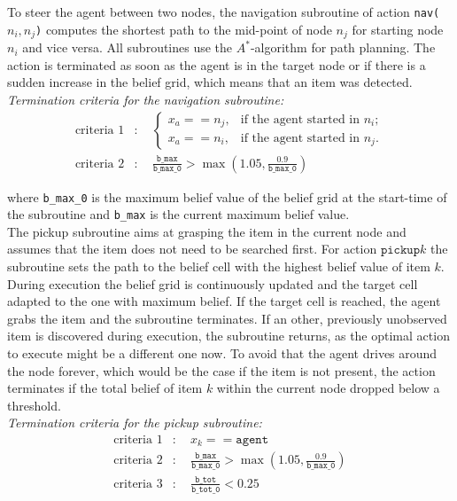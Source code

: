To steer the agent between two nodes, the navigation subroutine of action \texttt{nav($n_i, n_j$)} computes the shortest path to the mid-point of node $n_j$ for starting node $n_i$ and vice versa. All subroutines use the $A^*$-algorithm for path planning. The action is terminated as soon as the agent is in the target node or if there is a sudden increase in the belief grid, which means that an item was detected.\\

\textit{Termination criteria for the navigation subroutine:}
\begin{align}
    \text{criteria 1}&: \quad
    \begin{cases}x_a == n_j, &\text{if the agent started in }n_i;\\ 
    x_a == n_i, & \text{if the agent started in }n_j. \end{cases}\\
    \text{criteria 2}&:\quad \frac{\texttt{b\_max}}{\texttt{b\_max\_0}} > \max\left(1.05, \frac{0.9}{\texttt{b\_max\_0}}\right)
\end{align}

where \texttt{b\_max\_0} is the maximum belief value of the belief grid at the start-time of the subroutine and \texttt{b\_max} is the current maximum belief value.\\

The pickup subroutine aims at grasping the item in the current node and assumes that the item does not need to be searched first. For action $\texttt{pickup}k$ the subroutine sets the path to the belief cell with the highest belief value of item $k$. During execution the belief grid is continuously updated and the target cell adapted to the one with maximum belief. If the target cell is reached, the agent grabs the item and the subroutine terminates. If an other, previously unobserved item is discovered during execution, the subroutine returns, as the optimal action to execute might be a different one now. To avoid that the agent drives around the node forever, which would be the case if the item is not present, the action terminates if the total belief of item $k$ within the current node dropped below a threshold.\\

\textit{Termination criteria for the pickup subroutine:}
\begin{align}
    \text{criteria 1}&: \quad x_k == \texttt{agent}\\
    \text{criteria 2}&: \quad \frac{\texttt{b\_max}}{\texttt{b\_max\_0}} > \max\left(1.05, \frac{0.9}{\texttt{b\_max\_0}}\right)\\
    \text{criteria 3}&: \quad \frac{\texttt{b\_tot}}{\texttt{b\_tot\_0}} < 0.25
\end{align}

